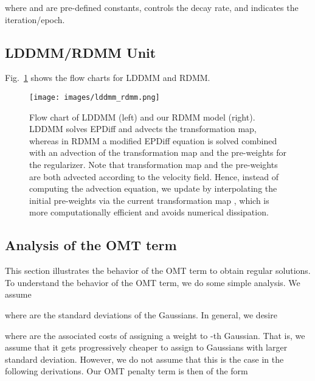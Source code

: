 \documentclass{article}
\numberwithin{equation}{section}
\newcommand{\zy}[1]{{\color{black}{#1}}}
\begin{document}
where  and  are pre-defined constants,  controls the decay rate, and  indicates the iteration/epoch.



\subsection{LDDMM/RDMM Unit}
\label{sec:unit}

Fig.~\ref{fig:pipeline} shows the flow charts for LDDMM and RDMM. \zy{Additionally, for RDMM with a pre-defined regularizer, we define  in the source image space, as foreground and background are easier to specify there. For RDMM with an optimized/learnt regularizer we define  in the pre-aligned image space, since the goal is to find the optimal initial conditions that determine the geodesic path based on the RDMM shooting equations; specifically, we take  as the input, and the final output composes the initial map and the transformation map, .}

\begin{figure}
\texttt{[image: images/lddmm\_rdmm.png]}
\caption{Flow chart of LDDMM (left) and our RDMM model (right). LDDMM solves EPDiff and advects the transformation map, whereas in RDMM a modified EPDiff equation is solved combined with an advection of the transformation map and the pre-weights for the regularizer. Note that transformation map  and the pre-weights  are both advected according to the velocity field. Hence, instead of computing the advection equation, we update  by interpolating the initial pre-weights  via the current transformation map , which is more computationally efficient and avoids numerical dissipation.
}
\label{fig:pipeline}
\end{figure}

\subsection{Analysis of the OMT term}
\label{sec:lp_derivation}

This section illustrates the behavior of the OMT term to obtain regular solutions. To understand the behavior of the OMT term, we do some simple analysis. We assume

where  are the standard deviations of the Gaussians. In general, we desire

where  are the associated costs of assigning a weight to -th Gaussian. That is, we assume that it gets progressively cheaper to assign to Gaussians with larger standard deviation. However, we do not assume that this is the case in the following derivations. Our OMT penalty term is then of the form
\end{document}
